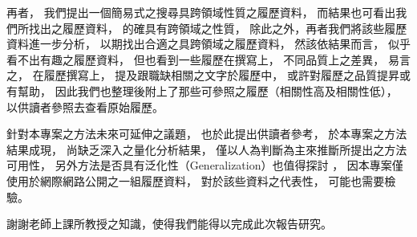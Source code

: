 \documentclass[sigconf]{acmart}
\begin{document}
再者，
我們提出一個簡易式之搜尋具跨領域性質之履歷資料，
而結果也可看出我們所找出之履歷資料，
的確具有跨領域之性質，
除此之外，再者我們將該些履歷資料進一步分析，
以期找出合適之具跨領域之履歷資料，
然該依結果而言，
似乎看不出有趣之履歷資料，
但也看到一些履歷在撰寫上，
不同品質上之差異，
易言之，
在履歷撰寫上，
提及跟職缺相關之文字於履歷中，
或許對履歷之品質提昇或有幫助，
因此我們也整理後附上了那些可參照之履歷（相關性高及相關性低），
以供讀者參照去查看原始履歷。

針對本專案之方法未來可延伸之議題，
也於此提出供讀者參考，
於本專案之方法結果成現，
尚缺乏深入之量化分析結果，
僅以人為判斷為主來推斷所提出之方法可用性，
另外方法是否具有泛化性（Generalization）也值得探討 \cite{murphy2012machine}，
因本專案僅使用於網際網路公開之一組履歷資料，
對於該些資料之代表性，
可能也需要檢驗。

\begin{acks}
    謝謝老師上課所教授之知識，使得我們能得以完成此次報告研究。
\end{acks}



\end{document}
